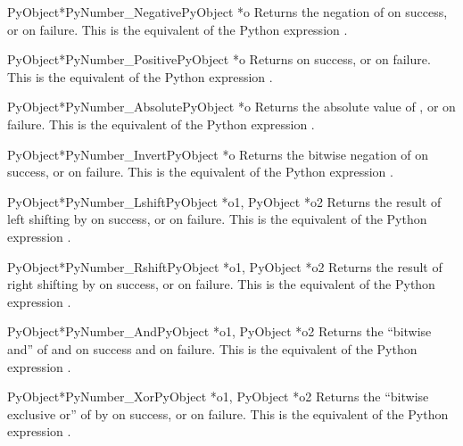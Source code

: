 \documentclass{manual}
\begin{document}
\begin{cfuncdesc}{PyObject*}{PyNumber_Negative}{PyObject *o}
Returns the negation of  on success, or \NULL{} on failure.
This is the equivalent of the Python expression .
\end{cfuncdesc}


\begin{cfuncdesc}{PyObject*}{PyNumber_Positive}{PyObject *o}
Returns  on success, or \NULL{} on failure.
This is the equivalent of the Python expression .
\end{cfuncdesc}


\begin{cfuncdesc}{PyObject*}{PyNumber_Absolute}{PyObject *o}
Returns the absolute value of , or \NULL{} on failure.  This is
the equivalent of the Python expression .
\end{cfuncdesc}


\begin{cfuncdesc}{PyObject*}{PyNumber_Invert}{PyObject *o}
Returns the bitwise negation of  on success, or \NULL{} on
failure.  This is the equivalent of the Python expression
.
\end{cfuncdesc}


\begin{cfuncdesc}{PyObject*}{PyNumber_Lshift}{PyObject *o1, PyObject *o2}
Returns the result of left shifting  by  on success,
or \NULL{} on failure.  This is the equivalent of the Python
expression .
\end{cfuncdesc}


\begin{cfuncdesc}{PyObject*}{PyNumber_Rshift}{PyObject *o1, PyObject *o2}
Returns the result of right shifting  by  on success,
or \NULL{} on failure.  This is the equivalent of the Python
expression .
\end{cfuncdesc}


\begin{cfuncdesc}{PyObject*}{PyNumber_And}{PyObject *o1, PyObject *o2}
Returns the ``bitwise and'' of  and  on success and
\NULL{} on failure. This is the equivalent of the Python expression
.
\end{cfuncdesc}


\begin{cfuncdesc}{PyObject*}{PyNumber_Xor}{PyObject *o1, PyObject *o2}
Returns the ``bitwise exclusive or'' of  by  on success,
or \NULL{} on failure.  This is the equivalent of the Python
expression .
\end{cfuncdesc}
\end{document}
